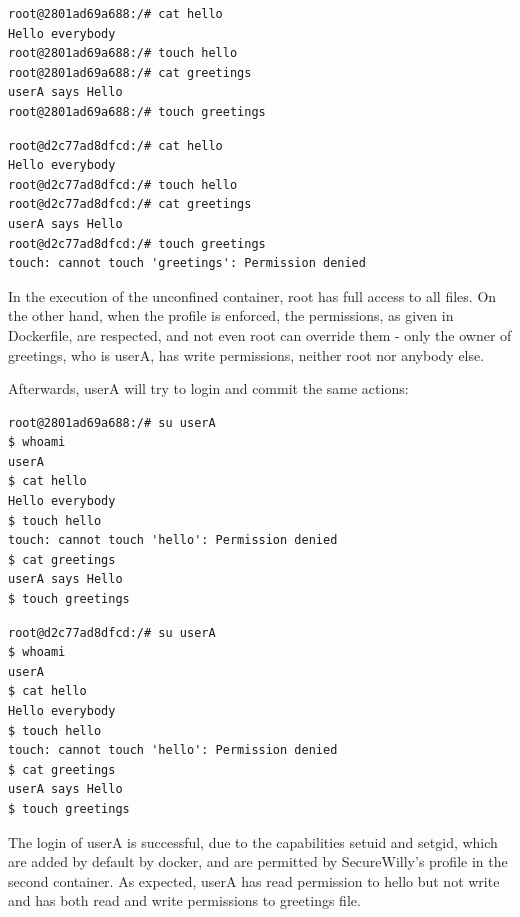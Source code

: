 \noindent\begin{minipage}{.49\textwidth}
\begin{lstlisting}[caption=Unconfined,style=terminal]
root@2801ad69a688:/# cat hello
Hello everybody
root@2801ad69a688:/# touch hello
root@2801ad69a688:/# cat greetings 
userA says Hello
root@2801ad69a688:/# touch greetings
\end{lstlisting}
\end{minipage}\hfill
\begin{minipage}{.49\textwidth}
\begin{lstlisting}[caption=Profile enforced,style=terminal]
root@d2c77ad8dfcd:/# cat hello  
Hello everybody
root@d2c77ad8dfcd:/# touch hello 
root@d2c77ad8dfcd:/# cat greetings 
userA says Hello
root@d2c77ad8dfcd:/# touch greetings 
touch: cannot touch 'greetings': Permission denied
\end{lstlisting}
\end{minipage}

In the execution of the unconfined container, root has full access to all files. On the other hand, when the profile is enforced, the permissions, as given in Dockerfile, are respected, and not even root can override them - only the owner of greetings, who is userA, has write permissions, neither root nor anybody else. 

Afterwards, userA will try to login and commit the same actions:

\noindent\begin{minipage}{.49\textwidth}
\begin{lstlisting}[caption=Unconfined,style=terminal]
root@2801ad69a688:/# su userA
$ whoami
userA
$ cat hello
Hello everybody
$ touch hello
touch: cannot touch 'hello': Permission denied
$ cat greetings
userA says Hello
$ touch greetings
\end{lstlisting}
\end{minipage}\hfill
\begin{minipage}{.49\textwidth}
\begin{lstlisting}[caption=Profile enforced,style=terminal]
root@d2c77ad8dfcd:/# su userA
$ whoami
userA
$ cat hello
Hello everybody
$ touch hello
touch: cannot touch 'hello': Permission denied
$ cat greetings
userA says Hello
$ touch greetings
\end{lstlisting}
\end{minipage}

The login of userA is successful, due to the capabilities setuid and setgid, which are added by default by docker, and are permitted by SecureWilly's profile in the second container. As expected, userA has read permission to hello but not write and has both read and write permissions to greetings file.

